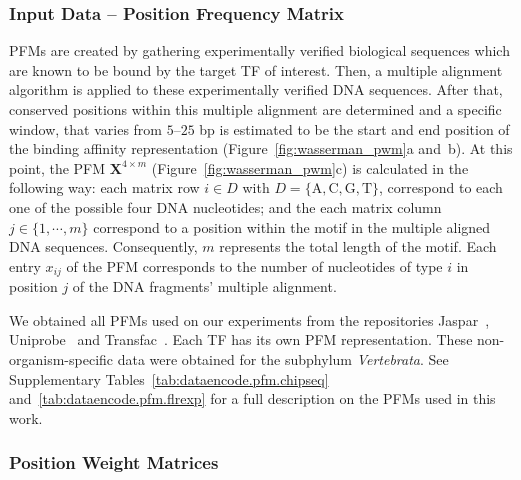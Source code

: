 \subsubsection{Input Data -- Position Frequency Matrix}

PFMs are created by gathering experimentally verified biological sequences which are known to be bound by the target TF of interest. Then, a multiple alignment algorithm is applied to these experimentally verified DNA sequences. After that, conserved positions within this multiple alignment are determined and a specific window, that varies from $5$--$25$ bp is estimated to be the start and end position of the binding affinity representation (Figure~\ref{fig:wasserman_pwm}a and~b). At this point, the PFM $\mathbf{X}^{4 \times m}$ (Figure~\ref{fig:wasserman_pwm}c) is calculated in the following way: each matrix row $i \in D$ with $D = \{\text{A},\text{C},\text{G},\text{T}\}$, correspond to each one of the possible four DNA nucleotides; and the each matrix column $ j \in \{1, \cdots, m\} $ correspond to a position within the motif in the multiple aligned DNA sequences. Consequently, $m$ represents the total length of the motif. Each entry $x_{ij}$ of the PFM corresponds to the number of nucleotides of type $ i $ in position $ j $ of the DNA fragments' multiple alignment.

We obtained all PFMs used on our experiments from the repositories Jaspar~\citep{mathelier2014}, Uniprobe~\citep{robasky2011} and Transfac~\citep{matys2006}. Each TF has its own PFM representation. These non-organism-specific data were obtained for the subphylum \emph{Vertebrata}. See Supplementary Tables~\ref{tab:dataencode.pfm.chipseq} and~\ref{tab:dataencode.pfm.flrexp} for a full description on the PFMs used in this work.

\subsubsection{Position Weight Matrices}

